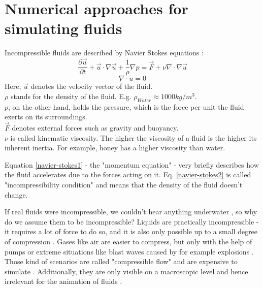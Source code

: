 \chapter{Numerical approaches for simulating fluids}\label{chapter:cudapressuresolver}

Incompressible fluids are described by Navier Stokes equations \parencite{navier1827memoire} \parencite{stokes1880theories}:\\
\begin{equation} \label{navier-stokes1}
    \frac{\partial \vec{u}}{\partial t} + \vec{u} \cdot \nabla \vec{u} + \frac{1}{\rho}  \nabla p = \vec{F} + \nu \nabla \cdot \nabla \vec{u}
\end{equation}
\begin{equation} \label{navier-stokes2}
    \nabla \cdot u = 0
\end{equation}
Here, $\vec{u}$ denotes the velocity vector of the fluid.\\
$\rho$ stands for the density of the fluid. E.g. $\rho_{Water} \approx 1000 kg/m^3$. \\
$p$, on the other hand, holds the pressure, which is the force per unit the fluid exerts on its surroundings.\\
$\vec{F}$ denotes external forces such as gravity and buoyancy.\\
$\nu$ is called kinematic viscosity. The higher the viscosity of a fluid is the higher its inherent inertia. For example, honey has a higher viscosity than water.\\
\par Equation \ref{navier-stokes1} - the "momentum equation" - very briefly describes how the fluid accelerates due to the forces acting on it. Eq. \ref{navier-stokes2} is called "incompressibility condition" and means that the density of the fluid doesn't change.
\par If real fluids were incompressible, we couldn't hear anything underwater \parencite{urick1967principles}, so why do we assume them to be incompressible? Liquids are practically incompressible - it requires a lot of force to do so, and it is also only possible up to a small degree of compression \parencite{kell1975density}. Gases like air are easier to compress, but only with the help of pumps \parencite{burenga1978portable} or extreme situations like blast waves caused by for example explosions \parencite{taylor1950formation} \parencite{taylor1950formation2}. Those kind of scenarios are called "compressible flow" and are expensive to simulate \parencite{poinsot1992boundary}. Additionally, they are only visible on a macroscopic level and hence irrelevant for the animation of fluids \parencite{bridson2015fluid}.
